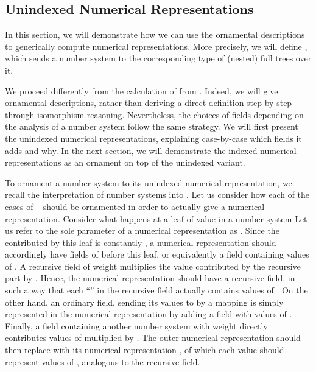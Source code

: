 \subsection{Unindexed Numerical Representations}\label{sec:trieo}
In this section, we will demonstrate how we can use the ornamental descriptions to generically compute numerical representations. More precisely, we will define , which sends a number system to the corresponding type of (nested) full trees over it.

We proceed differently from the calculation of  from \bN{}. Indeed, we will give ornamental descriptions, rather than deriving a direct definition step-by-step through isomorphism reasoning. Nevertheless, the choices of fields depending on the analysis of a number system follow the same strategy. We will first present the unindexed numerical representations, explaining case-by-case which fields it adds and why. In the next section, we will demonstrate the indexed numerical representations as an ornament on top of the unindexed variant. %

To ornament a number system to its unindexed numerical representation, we recall the interpretation  of number systems into \bN{}. Let us consider how each of the cases of \  should be ornamented in order to actually give a numerical representation. Consider what happens at a leaf of value  in a number system
Let us refer to the sole parameter of a numerical representation as . Since the  contributed by this leaf is constantly , a numerical representation should accordingly have  fields of  before this leaf, or equivalently a field containing  values of . A recursive field of weight 
multiplies the value contributed by the recursive part by . Hence, the numerical representation should have a recursive field, in such a way that each ``'' in the recursive field actually contains  values of . On the other hand, an ordinary field, sending its values to \bN{} by a mapping 
is simply represented in the numerical representation by adding a field with  values of . Finally, a field containing another number system  with weight 
directly contributes values of  multiplied by . The outer numerical representation should then replace  with its numerical representation , of which each value should represent  values of , analogous to the recursive field.


